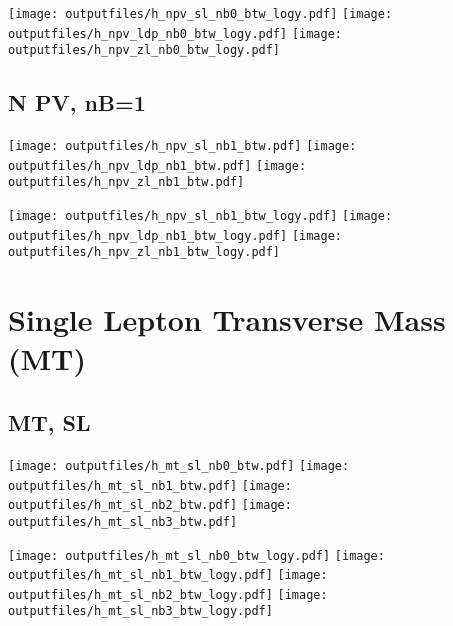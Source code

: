 \documentclass[11pt]{article}
\begin{document}
    \noindent
     \texttt{[image: outputfiles/h\_npv\_sl\_nb0\_btw\_logy.pdf]}
     \texttt{[image: outputfiles/h\_npv\_ldp\_nb0\_btw\_logy.pdf]}
     \texttt{[image: outputfiles/h\_npv\_zl\_nb0\_btw\_logy.pdf]}




    \subsection{ N PV, nB=1 }

    \noindent
     \texttt{[image: outputfiles/h\_npv\_sl\_nb1\_btw.pdf]}
     \texttt{[image: outputfiles/h\_npv\_ldp\_nb1\_btw.pdf]}
     \texttt{[image: outputfiles/h\_npv\_zl\_nb1\_btw.pdf]}

    \noindent
     \texttt{[image: outputfiles/h\_npv\_sl\_nb1\_btw\_logy.pdf]}
     \texttt{[image: outputfiles/h\_npv\_ldp\_nb1\_btw\_logy.pdf]}
     \texttt{[image: outputfiles/h\_npv\_zl\_nb1\_btw\_logy.pdf]}



    \section{Single Lepton Transverse Mass (MT)}


    \subsection{ MT, SL }

    \noindent
     \texttt{[image: outputfiles/h\_mt\_sl\_nb0\_btw.pdf]}
     \texttt{[image: outputfiles/h\_mt\_sl\_nb1\_btw.pdf]}
     \texttt{[image: outputfiles/h\_mt\_sl\_nb2\_btw.pdf]}
     \texttt{[image: outputfiles/h\_mt\_sl\_nb3\_btw.pdf]}

    \noindent
     \texttt{[image: outputfiles/h\_mt\_sl\_nb0\_btw\_logy.pdf]}
     \texttt{[image: outputfiles/h\_mt\_sl\_nb1\_btw\_logy.pdf]}
     \texttt{[image: outputfiles/h\_mt\_sl\_nb2\_btw\_logy.pdf]}
     \texttt{[image: outputfiles/h\_mt\_sl\_nb3\_btw\_logy.pdf]}
\end{document}
